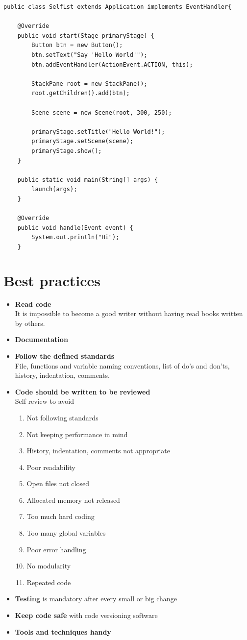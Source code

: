 \documentclass[10pt,a4paper]{book}
\begin{document}
\begin{verbatim}
public class SelfLst extends Application implements EventHandler{
    
    @Override
    public void start(Stage primaryStage) {
        Button btn = new Button();
        btn.setText("Say 'Hello World'");
        btn.addEventHandler(ActionEvent.ACTION, this);

        StackPane root = new StackPane();
        root.getChildren().add(btn);
        
        Scene scene = new Scene(root, 300, 250);
        
        primaryStage.setTitle("Hello World!");
        primaryStage.setScene(scene);
        primaryStage.show();
    }

    public static void main(String[] args) {
        launch(args);
    }

    @Override
    public void handle(Event event) {
        System.out.println("Hi");
    }

\end{verbatim}
\newpage
\section{Best practices}
\begin{itemize}
\item {\bf Read code}\\
It is impossible to become a good writer without having read books written by others.
\item \textbf{Documentation}
\item \textbf{Follow the defined standards}\\
File, functions and variable naming conventions, list of do's and don'ts, history, indentation, comments.
\item \textbf{Code should be written to be reviewed}\\
Self review to avoid
\begin{enumerate}
\item Not following standards
\item Not keeping performance in mind
\item History, indentation, comments not appropriate
\item Poor readability
\item Open files not closed
\item Allocated memory not released
\item Too much hard coding
\item Too many global variables
\item Poor error handling
\item No modularity
\item Repeated code
\end{enumerate}
\item \textbf{Testing} is mandatory after every small or big change
\item \textbf{Keep code safe} with code versioning software
\item \textbf{Tools and techniques handy}
\end{itemize}
\end{document}
